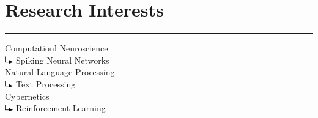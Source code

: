 \documentclass[]{rahulworld-resume}
\begin{document}
\begin{minipage}[t]{0.35\textwidth}
\section{Research Interests}
\noindent\rule{5cm}{0.4pt}
Computationl Neuroscience\\
\includegraphics[width=10pt]{subarrow.png} Spiking Neural Networks\\
Natural Language Processing\\
\includegraphics[width=10pt]{subarrow.png} Text Processing\\
Cybernetics\\
\includegraphics[width=10pt]{subarrow.png} Reinforcement Learning
\sectionsep
%
%

\end{minipage} 
\hfill
\end{document}
